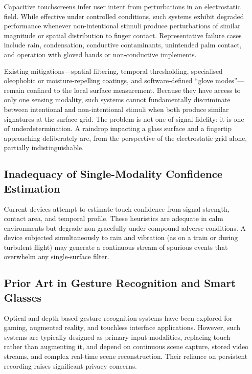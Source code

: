 \documentclass[11pt,letterpaper]{article}
\begin{document}
Capacitive touchscreens infer user intent from perturbations in an electrostatic
field. While effective under controlled conditions, such systems exhibit degraded
performance whenever non-intentional stimuli produce perturbations of similar
magnitude or spatial distribution to finger contact. Representative failure cases
include rain, condensation, conductive contaminants, unintended palm contact, and
operation with gloved hands or non-conductive implements.

Existing mitigations---spatial filtering, temporal thresholding, specialised
oleophobic or moisture-repelling coatings, and software-defined ``glove modes''---
remain confined to the local surface measurement. Because they have access to only
one sensing modality, such systems cannot fundamentally discriminate between
intentional and non-intentional stimuli when both produce similar signatures at the
surface grid. The problem is not one of signal fidelity; it is one of underdetermination.
A raindrop impacting a glass surface and a fingertip approaching deliberately are, from
the perspective of the electrostatic grid alone, partially indistinguishable.

\subsection{Inadequacy of Single-Modality Confidence Estimation}

Current devices attempt to estimate touch confidence from signal strength, contact
area, and temporal profile. These heuristics are adequate in calm environments but
degrade non-gracefully under compound adverse conditions. A device subjected
simultaneously to rain and vibration (as on a train or during turbulent flight) may
generate a continuous stream of spurious events that overwhelm any single-surface
filter.

\subsection{Prior Art in Gesture Recognition and Smart Glasses}

Optical and depth-based gesture recognition systems have been explored for gaming,
augmented reality, and touchless interface applications. However, such systems are
typically designed as primary input modalities, replacing touch rather than augmenting
it, and depend on continuous scene capture, stored video streams, and complex real-time
scene reconstruction. Their reliance on persistent recording raises significant privacy
concerns.
\end{document}
